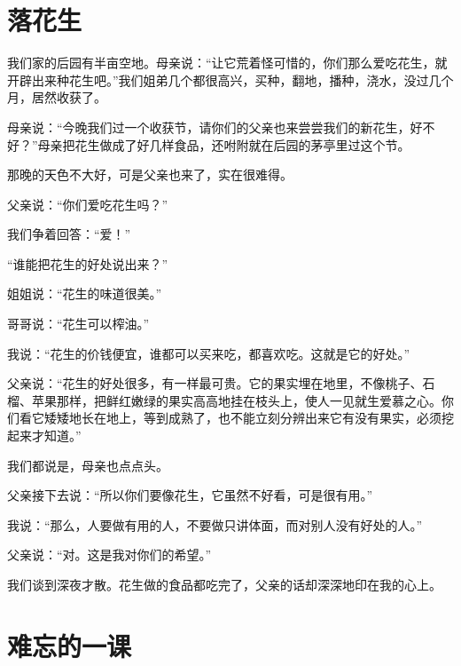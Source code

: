 \documentclass[12pt,UTF-8,openany]{ctexbook}
\begin{document}
\chapter{落花生}

\begin{large}
    
    我们家的后园有半亩空地。母亲说：“让它荒着怪可惜的，你们那么爱吃花生，就开辟出来种花生吧。”我们姐弟几个都很高兴，买种，翻地，播种，浇水，没过几个月，居然收获了。
    
    母亲说：“今晚我们过一个收获节，请你们的父亲也来尝尝我们的新花生，好不好？”母亲把花生做成了好几样食品，还咐附就在后园的茅亭里过这个节。
    
    那晚的天色不大好，可是父亲也来了，实在很难得。
    
    父亲说：“你们爱吃花生吗？”
    
    我们争着回答：“爱！”
    
    “谁能把花生的好处说出来？”
    
    姐姐说：“花生的味道很美。”
    
    哥哥说：“花生可以榨油。”
    
    我说：“花生的价钱便宜，谁都可以买来吃，都喜欢吃。这就是它的好处。”
    
    父亲说：“花生的好处很多，有一样最可贵。它的果实埋在地里，不像桃子、石榴、苹果那样，把鲜红嫩绿的果实高高地挂在枝头上，使人一见就生爱慕之心。你们看它矮矮地长在地上，等到成熟了，也不能立刻分辨出来它有没有果实，必须挖起来才知道。”
    
    我们都说是，母亲也点点头。
    
    父亲接下去说：“所以你们要像花生，它虽然不好看，可是很有用。”
    
    我说：“那么，人要做有用的人，不要做只讲体面，而对别人没有好处的人。”
    
    父亲说：“对。这是我对你们的希望。”
    
    我们谈到深夜才散。花生做的食品都吃完了，父亲的话却深深地印在我的心上。
    
\end{large}



\chapter{难忘的一课}
\end{document}

